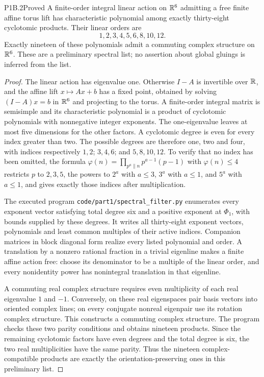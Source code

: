 \begin{statement}{P1B.2}{Proved}
A finite-order integral linear action on $\mathbb R^6$ admitting a
free finite affine torus lift has characteristic polynomial
among exactly thirty-eight cyclotomic products. Their linear
orders are
\[
 1,2,3,4,5,6,8,10,12.
\]
Exactly nineteen of these polynomials admit a commuting complex
structure on $\mathbb R^6$. These are a preliminary spectral list;
no assertion about global gluings is inferred from the list.
\end{statement}
\begin{proof}
The linear action has eigenvalue one. Otherwise $I-A$ is
invertible over $\mathbb R$, and the affine lift $x\mapsto Ax+b$
has a fixed point, obtained by solving $(I-A)x=b$ in $\mathbb R^6$
and projecting to the torus. A finite-order integral matrix is
semisimple and its characteristic polynomial is a product of
cyclotomic polynomials with nonnegative integer exponents.
The one-eigenvalue leaves at most five dimensions for the other
factors. A cyclotomic degree is even for every index greater
than two. The possible degrees are therefore one, two and four,
with indices respectively $1,2$; $3,4,6$; and $5,8,10,12$.
To verify that no index has been omitted, the formula
$\varphi(n)=\prod_{p^a\parallel n}p^{a-1}(p-1)$ with
$\varphi(n)\le4$ restricts $p$ to $2,3,5$, the powers to
$2^a$ with $a\le3$, $3^a$ with $a\le1$, and $5^a$ with
$a\le1$, and gives exactly those indices after multiplication.

The executed program \texttt{code/part1/spectral\_filter.py}
enumerates every exponent vector satisfying total degree six
and a positive exponent at $\Phi_1$, with bounds supplied by
these degrees. It writes all thirty-eight exponent vectors,
polynomials and least common multiples of their active indices.
Companion matrices in block diagonal form realize every listed
polynomial and order. A translation by a nonzero rational
fraction in a trivial eigenline makes a finite affine action
free: choose its denominator to be a multiple of the linear
order, and every nonidentity power has nonintegral translation
in that eigenline.

A commuting real complex structure requires even multiplicity
of each real eigenvalue $1$ and $-1$. Conversely, on these real
eigenspaces pair basis vectors into oriented complex lines;
on every conjugate nonreal eigenpair use its rotation complex
structure. This constructs a commuting complex structure.
The program checks these two parity conditions and obtains
nineteen products. Since the remaining cyclotomic factors have
even degrees and the total degree is six, the two real
multiplicities have the same parity. Thus the nineteen
complex-compatible products are exactly the orientation-preserving
ones in this preliminary list.
\end{proof}
